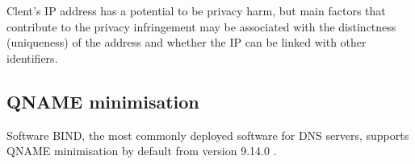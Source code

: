 Clent's IP address has a potential to be privacy harm, but main factors that contribute to the privacy infringement may be associated with the distinctness (uniqueness) of the address and whether the IP can be linked with other identifiers.

\subsection{QNAME minimisation}
Software BIND, the most commonly deployed software for DNS servers, supports QNAME minimisation by default from version 9.14.0 \cite{bind9qname}.